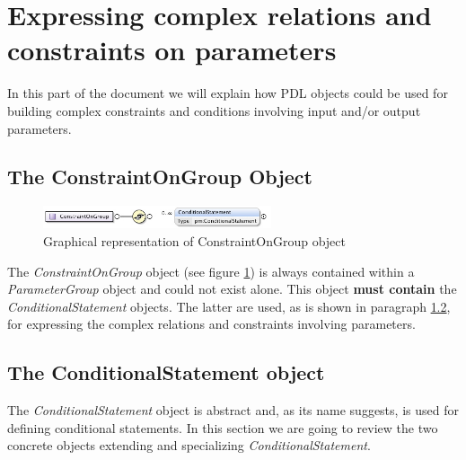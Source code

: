 \documentclass[a4paper,11pt] {ivoa}
\begin{document}
\section{Expressing complex relations and constraints on parameters}\label{complexRelations}
In this part of the document we will explain how PDL objects could be used for building complex
constraints and conditions involving input and/or output parameters.

\subsection{The ConstraintOnGroup Object}\label{par-ConstraintsOnGroup}
\begin{figure}[htbp]
\begin{center}
\includegraphics[width=0.6\textwidth]{pictures/ConstraintOnGroup.jpg} 
\caption{Graphical representation of ConstraintOnGroup object}
\label{Pic-ConstraintOnGroup}
\end{center}
\end{figure}

The {\it  ConstraintOnGroup} object (see figure \ref{Pic-ConstraintOnGroup}) is always contained within a {\it ParameterGroup} object and could not exist alone.
This object {\bf must contain} the {\it ConditionalStatement} objects. The latter are used, as is
shown in paragraph \ref{par-ConditionalStatement}, for expressing the complex relations and
constraints involving parameters.

\subsection{The ConditionalStatement object}\label{par-ConditionalStatement}
The {\it ConditionalStatement} object is abstract and, as its name suggests, is used for defining conditional statements. In this section we are going to review the two concrete objects
extending and specializing  {\it ConditionalStatement}.
\end{document}
